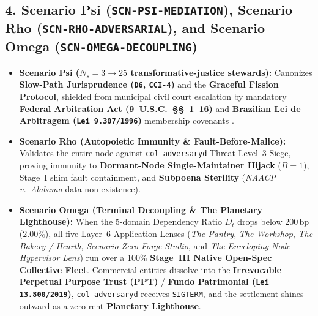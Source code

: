 \subsection{4. Scenario Psi (\texttt{SCN-PSI-MEDIATION}), Scenario Rho (\texttt{SCN-RHO-ADVERSARIAL}), and Scenario Omega (\texttt{SCN-OMEGA-DECOUPLING})}
\begin{itemize}
    \item \textbf{Scenario Psi ($N_s = 3 \to 25$ transformative-justice stewards):} Canonizes \textbf{Slow-Path Jurisprudence (\texttt{D6}, \texttt{CCI-4})} and the \textbf{Graceful Fission Protocol}, shielded from municipal civil court escalation by mandatory \textbf{Federal Arbitration Act (9~U.S.C.~\S\S~1--16)} and \textbf{Brazilian Lei de Arbitragem (\texttt{Lei 9.307/1996})} membership covenants \parencite{faa1925,brazil_arbitragem1996}.
    \item \textbf{Scenario Rho (Autopoietic Immunity \& Fault-Before-Malice):} Validates the entire node against \texttt{col-adversaryd} Threat Level~3 Siege, proving immunity to \textbf{Dormant-Node Single-Maintainer Hijack} ($B=1$), Stage~I shim fault containment, and \textbf{Subpoena Sterility} (\textit{NAACP v.~Alabama} data non-existence).
    \item \textbf{Scenario Omega (Terminal Decoupling \& The Planetary Lighthouse):} When the 5-domain Dependency Ratio $D_t$ drops below $200\,\mathrm{bp}$ ($2.00\%$), all five Layer~6 Application Lenses (\textit{The Pantry}, \textit{The Workshop}, \textit{The Bakery / Hearth}, \textit{Scenario Zero Forge Studio}, and \textit{The Enveloping Node Hypervisor Lens}) run over a 100\% \textbf{Stage~III Native Open-Spec Collective Fleet}. Commercial entities dissolve into the \textbf{Irrevocable Perpetual Purpose Trust (PPT)} / \textbf{Fundo Patrimonial (\texttt{Lei 13.800/2019})}, \texttt{col-adversaryd} receives \texttt{SIGTERM}, and the settlement shines outward as a zero-rent \textbf{Planetary Lighthouse}.
\end{itemize}
